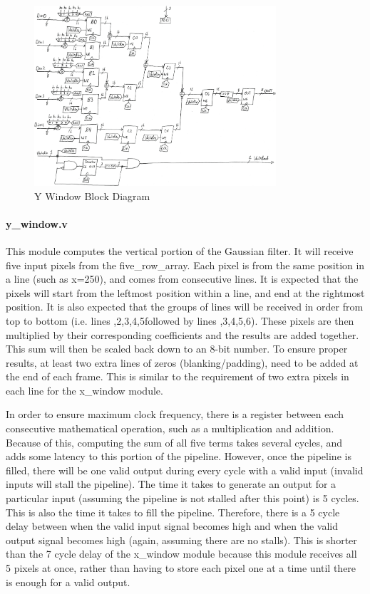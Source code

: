 \begin{figure}
    \centering
    \includegraphics[width=0.8\textwidth]{processed_image_pngs/y_window.png}
    \caption{Y Window Block Diagram}
    \label{fig:y_window}
\end{figure}



\paragraph{y\_window.v} 

This module computes the vertical portion of the Gaussian filter. It 
will receive five input pixels from the five\_row\_array. Each pixel is from the 
same position in a line (such as x=250), and comes from consecutive lines. It is 
expected that the pixels will start from the leftmost position within a line, 
and end at the rightmost position. It is also expected that the groups of lines 
will be received in order from top to bottom (i.e. lines ,2,3,4,5\rbrack followed by 
lines ,3,4,5,6\rbrack). These pixels are then multiplied by their corresponding 
coefficients and the results are added together. This sum will then be scaled 
back down to an 8-bit number. To ensure proper results, at least two extra lines 
of zeros (blanking/padding), need to be added at the end of each frame. This is 
similar to the requirement of two extra pixels in each line for the x\_window 
module.

In order to ensure maximum clock frequency, there is a register between each 
consecutive mathematical operation, such as a multiplication and addition. 
Because of this, computing the sum of all five terms takes several cycles, and 
adds some latency to this portion of the pipeline. However, once the pipeline is 
filled, there will be one valid output during every cycle with a valid input 
(invalid inputs will stall the pipeline). The time it takes to generate an 
output for a particular input (assuming the pipeline is not stalled after this 
point) is 5 cycles. This is also the time it takes to fill the pipeline. 
Therefore, there is a 5 cycle delay between when the valid input signal becomes 
high and when the valid output signal becomes high (again, assuming there are no 
stalls). This is shorter than the 7 cycle delay of the x\_window module because 
this module receives all 5 pixels at once, rather than having to store each 
pixel one at a time until there is enough for a valid output.

